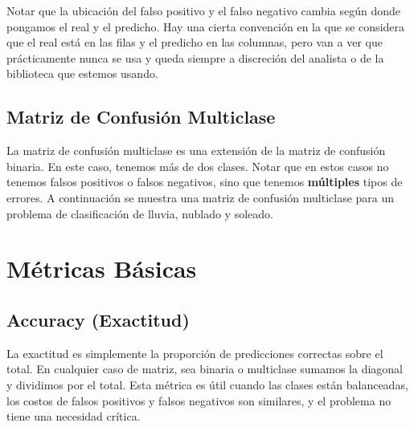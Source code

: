 \documentclass[12pt]{article}
\begin{document}
Notar que la ubicación del falso positivo y el falso negativo cambia según donde pongamos el real y el predicho. Hay una cierta convención en la que se considera que el real está en las filas y el predicho en las columnas, pero van a ver que prácticamente nunca se usa y queda siempre a discreción del analista o de la biblioteca que estemos usando.

\subsection{Matriz de Confusión Multiclase}
La matriz de confusión multiclase es una extensión de la matriz de confusión binaria. En este caso, tenemos más de dos clases. Notar que en estos casos no tenemos falsos positivos o falsos negativos, sino que tenemos \textbf{múltiples} tipos de errores. A continuación se muestra una matriz de confusión multiclase para un problema de clasificación de lluvia, nublado y soleado.

\begin{center}
\end{center}
\section{Métricas Básicas}

\subsection{Accuracy (Exactitud)}
La exactitud es simplemente la proporción de predicciones correctas sobre el total. En cualquier caso de matriz, sea binaria o multiclase sumamos la diagonal y dividimos por el total. Esta métrica es útil cuando las clases están balanceadas, los costos de falsos positivos y falsos negativos son similares, y el problema no tiene una necesidad crítica.
\end{document}
